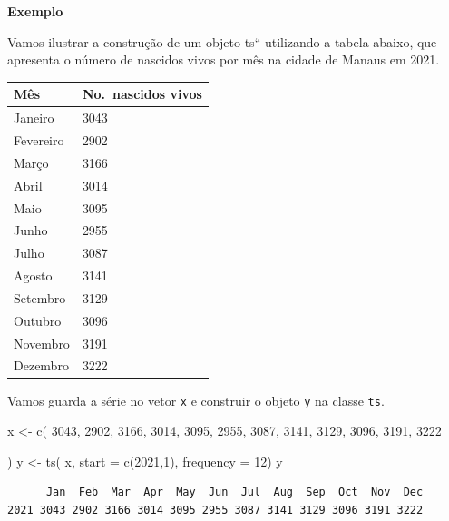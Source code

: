 \documentclass[
  letterpaper,
  DIV=11,
  numbers=noendperiod]{scrreprt}
\newenvironment{Shaded}{\begin{snugshade}}{\end{snugshade}}
\newcommand{\AttributeTok}[1]{\textcolor[rgb]{0.40,0.45,0.13}{#1}}
\newcommand{\DecValTok}[1]{\textcolor[rgb]{0.68,0.00,0.00}{#1}}
\newcommand{\FunctionTok}[1]{\textcolor[rgb]{0.28,0.35,0.67}{#1}}
\newcommand{\NormalTok}[1]{\textcolor[rgb]{0.00,0.23,0.31}{#1}}
\newcommand{\OtherTok}[1]{\textcolor[rgb]{0.00,0.23,0.31}{#1}}
\begin{document}
\textbf{Exemplo}

Vamos ilustrar a construção de um objeto ts`` utilizando a tabela
abaixo, que apresenta o número de nascidos vivos por mês na cidade de
Manaus em 2021.

\begin{longtable}[]{@{}ll@{}}
\toprule\noalign{}
Mês & No.~nascidos vivos \\
\midrule\noalign{}
\endhead
\bottomrule\noalign{}
\endlastfoot
Janeiro & 3043 \\
Fevereiro & 2902 \\
Março & 3166 \\
Abril & 3014 \\
Maio & 3095 \\
Junho & 2955 \\
Julho & 3087 \\
Agosto & 3141 \\
Setembro & 3129 \\
Outubro & 3096 \\
Novembro & 3191 \\
Dezembro & 3222 \\
\end{longtable}

Vamos guarda a série no vetor \texttt{x} e construir o objeto \texttt{y}
na classe \texttt{ts}.

\begin{Shaded}
\begin{Highlighting}[]
\NormalTok{x }\OtherTok{\textless{}{-}} \FunctionTok{c}\NormalTok{(}
  \DecValTok{3043}\NormalTok{, }\DecValTok{2902}\NormalTok{, }\DecValTok{3166}\NormalTok{, }\DecValTok{3014}\NormalTok{,}
\DecValTok{3095}\NormalTok{, }\DecValTok{2955}\NormalTok{, }\DecValTok{3087}\NormalTok{, }\DecValTok{3141}\NormalTok{,}
\DecValTok{3129}\NormalTok{, }\DecValTok{3096}\NormalTok{, }\DecValTok{3191}\NormalTok{, }\DecValTok{3222}

\NormalTok{)}
\NormalTok{y }\OtherTok{\textless{}{-}} \FunctionTok{ts}\NormalTok{( x, }\AttributeTok{start =} \FunctionTok{c}\NormalTok{(}\DecValTok{2021}\NormalTok{,}\DecValTok{1}\NormalTok{), }\AttributeTok{frequency =} \DecValTok{12}\NormalTok{)}
\NormalTok{y}
\end{Highlighting}
\end{Shaded}

\begin{verbatim}
      Jan  Feb  Mar  Apr  May  Jun  Jul  Aug  Sep  Oct  Nov  Dec
2021 3043 2902 3166 3014 3095 2955 3087 3141 3129 3096 3191 3222
\end{verbatim}
\end{document}
